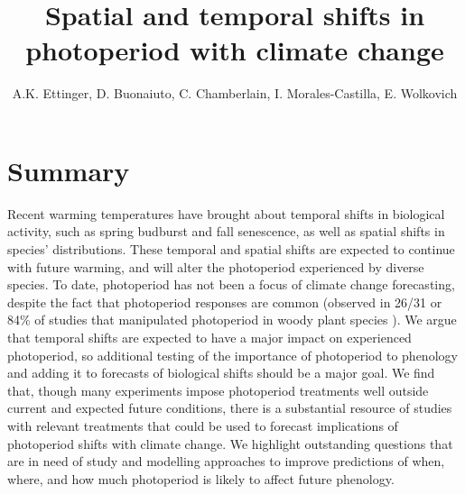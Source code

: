 \documentclass{article}
\begin{document}
 
\title{Spatial and temporal shifts in photoperiod with climate change} %

\author{A.K. Ettinger, D. Buonaiuto, C. Chamberlain, I. Morales-Castilla, E. Wolkovich}
\maketitle  %


\section*{Summary}
Recent warming temperatures have brought about temporal shifts in biological activity, such as spring budburst and fall senescence, as well as spatial shifts in species' distributions. These temporal and spatial shifts are expected to continue with future warming, and will alter the photoperiod experienced by diverse species. To date, photoperiod has not been a focus of climate change forecasting, despite the fact that photoperiod responses are common (observed in 26/31 or 84\% of studies that manipulated photoperiod in woody plant species ). We argue that temporal shifts are expected to have a major impact on experienced photoperiod, so additional testing of the importance of photoperiod to phenology and adding it to forecasts of biological shifts should be a major goal. We find that, though many experiments impose photoperiod treatments well outside current and expected future conditions, there is a substantial resource of studies with relevant treatments that could be used to forecast implications of photoperiod shifts with climate change. We highlight outstanding questions that are in need of study and modelling approaches to improve predictions of when, where, and how much photoperiod is likely to affect future phenology.
\end{document}
